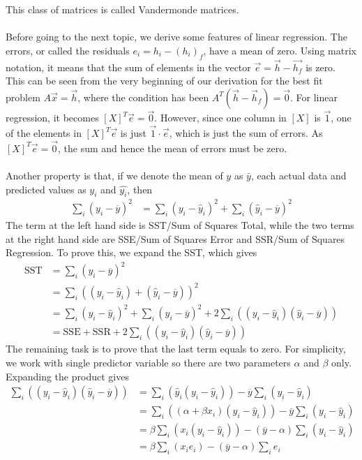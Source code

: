 This class of matrices is called Vandermonde matrices.\\
\\
Before going to the next topic, we derive some features of linear regression. The errors, or called the residuals $e_i = h_i - (h_i)_f$, have a mean of zero. Using matrix notation, it means that the sum of elements in the vector $\vec{e} = \vec{h} - \vec{h_f}$ is zero. This can be seen from the very beginning of our derivation for the best fit problem $A\vec{x} = \vec{h}$, where the condition has been $A^T(\vec{h} - \vec{h}_f) = \vec{0}$. For linear regression, it becomes $[X]^T\vec{e} = \vec{0}$. However, since one column in $[X]$ is $\vec{1}$, one of the elements in $[X]^T\vec{e}$ is just $\vec{1} \cdot \vec{e}$, which is just the sum of errors. As $[X]^T\vec{e} = \vec{0}$, the sum and hence the mean of errors must be zero.\\
\\
Another property is that, if we denote the mean of $y$ as $\bar{y}$, each actual data and predicted values as $y_i$ and $\hat{y_i}$, then
\begin{align*}
\sum_i (y_i - \overline{y})^2 &= \sum_i (y_i - \hat{y}_i)^2 + \sum_i (\hat{y}_i - \overline{y})^2
\end{align*}
The term at the left hand side is SST/Sum of Squares Total, while the two terms at the right hand side are SSE/Sum of Squares Error and SSR/Sum of Squares Regression. To prove this, we expand the SST, which gives
\begin{align*}
\text{SST} &= \sum_i (y_i - \overline{y})^2 \\
&= \sum_i ((y_i - \hat{y}_i) + (\hat{y}_i - \overline{y}))^2 \\
&= \sum_i (y_i - \hat{y}_i)^2 + \sum_i (\hat{y}_i - \overline{y})^2 + 2\sum_i ((y_i - \hat{y}_i) (\hat{y}_i - \overline{y})) \\
&= \text{SSE} + \text{SSR} + 2\sum_i ((y_i - \hat{y}_i) (\hat{y}_i - \overline{y}))
\end{align*}
The remaining task is to prove that the last term equals to zero. For simplicity, we work with single predictor variable so there are two parameters $\alpha$ and $\beta$ only. Expanding the product gives
\begin{align*}
\sum_i ((y_i - \hat{y}_i) (\hat{y}_i - \overline{y})) &= \sum_i (\hat{y}_i(y_i - \hat{y}_i)) - \overline{y} \sum_i (y_i - \hat{y}_i) \\
&= \sum_i ((\alpha + \beta x_i)(y_i - \hat{y}_i)) - \overline{y} \sum_i (y_i - \hat{y}_i) \\
&= \beta \sum_i (x_i(y_i - \hat{y}_i)) - (\overline{y} - \alpha) \sum_i (y_i - \hat{y}_i) \\
&= \beta \sum_i (x_i e_i) - (\overline{y} - \alpha) \sum_i e_i
\end{align*}
